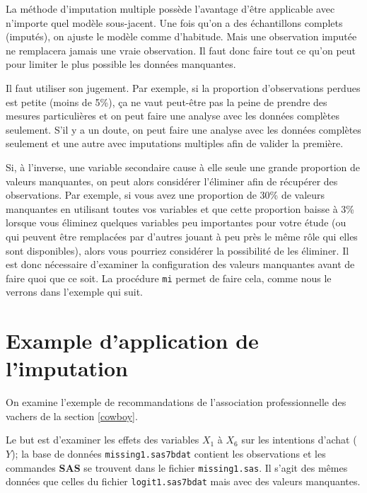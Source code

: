\documentclass[
  11pt,
  letterpaper,
]{book}
\theoremstyle{definition}
\theoremstyle{definition}
\theoremstyle{definition}
\theoremstyle{remark}
\begin{document}
La méthode d'imputation multiple possède l'avantage d'être applicable avec n'importe quel modèle sous-jacent. Une fois qu'on a des échantillons complets (imputés), on ajuste le modèle comme d'habitude. Mais une observation imputée ne remplacera jamais une vraie observation. Il faut donc faire tout ce qu'on peut pour limiter le plus possible les données manquantes.

Il faut utiliser son jugement. Par exemple, si la proportion d'observations perdues est petite (moins de 5\%), ça ne vaut peut-être pas la peine de prendre des mesures particulières et on peut faire une analyse avec les données complètes seulement. S'il y a un doute, on peut faire une analyse avec les données complètes seulement et une autre avec imputations multiples afin de valider la première.

Si, à l'inverse, une variable secondaire cause à elle seule une grande proportion de valeurs manquantes, on peut alors considérer l'éliminer afin de récupérer des observations. Par exemple, si vous avez une proportion de 30\% de valeurs manquantes en utilisant toutes vos variables et que cette proportion baisse à 3\% lorsque vous éliminez quelques variables peu importantes pour votre étude (ou qui peuvent être remplacées par d'autres jouant à peu près le même rôle qui elles sont disponibles), alors vous pourriez considérer la possibilité de les éliminer. Il est donc nécessaire d'examiner la configuration des valeurs manquantes avant de faire quoi que ce soit. La procédure \texttt{mi} permet de faire cela, comme nous le verrons dans l'exemple qui suit.

\hypertarget{example-dapplication-de-limputation}{%
\section{Example d'application de l'imputation}\label{example-dapplication-de-limputation}}

On examine l'exemple de recommandations de l'association professionnelle des vachers de la section \ref{cowboy}.

Le but est d'examiner les effets des variables \(X_1\) à \(X_6\) sur les intentions d'achat (\(Y\)); la base de données \texttt{missing1.sas7bdat} contient les observations et les commandes \textbf{SAS} se trouvent dans le fichier \texttt{missing1.sas}. Il s'agit des mêmes données que celles du fichier \texttt{logit1.sas7bdat} mais avec des valeurs manquantes.
\end{document}
